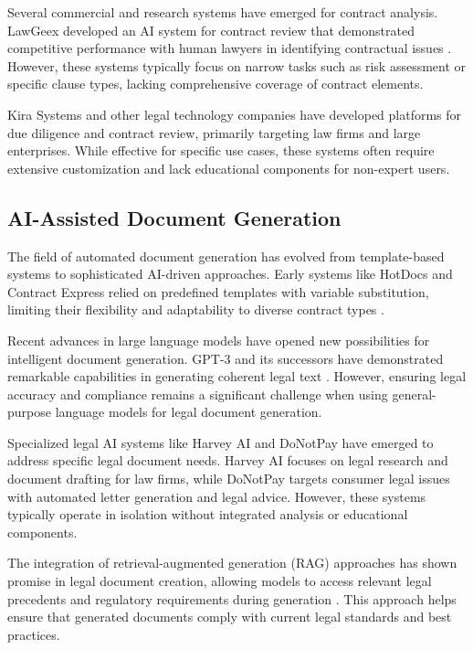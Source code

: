 Several commercial and research systems have emerged for contract analysis. LawGeex developed an AI system for contract review that demonstrated competitive performance with human lawyers in identifying contractual issues \cite{katz2018legal}. However, these systems typically focus on narrow tasks such as risk assessment or specific clause types, lacking comprehensive coverage of contract elements.

Kira Systems and other legal technology companies have developed platforms for due diligence and contract review, primarily targeting law firms and large enterprises. While effective for specific use cases, these systems often require extensive customization and lack educational components for non-expert users.

\subsection{AI-Assisted Document Generation}

The field of automated document generation has evolved from template-based systems to sophisticated AI-driven approaches. Early systems like HotDocs and Contract Express relied on predefined templates with variable substitution, limiting their flexibility and adaptability to diverse contract types \cite{lauritsen2017document}.

Recent advances in large language models have opened new possibilities for intelligent document generation. GPT-3 and its successors have demonstrated remarkable capabilities in generating coherent legal text \cite{brown2020language}. However, ensuring legal accuracy and compliance remains a significant challenge when using general-purpose language models for legal document generation.

Specialized legal AI systems like Harvey AI and DoNotPay have emerged to address specific legal document needs. Harvey AI focuses on legal research and document drafting for law firms, while DoNotPay targets consumer legal issues with automated letter generation and legal advice. However, these systems typically operate in isolation without integrated analysis or educational components.

The integration of retrieval-augmented generation (RAG) approaches has shown promise in legal document creation, allowing models to access relevant legal precedents and regulatory requirements during generation \cite{lewis2020retrieval}. This approach helps ensure that generated documents comply with current legal standards and best practices.

